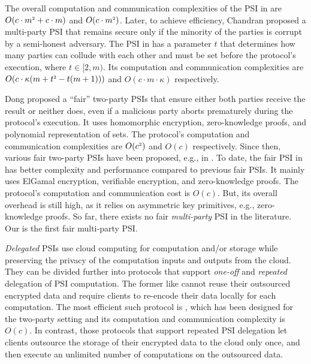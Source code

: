 The overall computation and communication complexities of the PSI in  \cite{DBLP:conf/ccs/KolesnikovMPRT17} are  $O(c\cdot m^{\scriptscriptstyle 2}+c\cdot m )$ and $O(c\cdot m^{\scriptscriptstyle 2})$. Later, to achieve efficiency, Chandran \et \cite{ChandranD0OSS21} proposed a multi-party PSI that remains secure only if the minority of the parties is corrupt by a semi-honest adversary. The PSI in \cite{NevoTY21} has a parameter $t$ that determines how many parties can collude with each other and must be set before the protocol's execution, where $t\in [2, m)$.  
%
%
Its computation and communication complexities are $O(c\cdot \kappa(m+t^{\scriptscriptstyle 2}-t(m+1)))$ and $O(c\cdot m\cdot \kappa)$ respectively.


Dong \et proposed a ``fair'' two-party PSIs \cite{DBLP:conf/dbsec/DongCCR13} that ensure either both parties receive the result or neither does, even if a malicious party aborts prematurely during the protocol's execution. It uses homomorphic encryption,  zero-knowledge proofs, and polynomial representation of sets. The protocol's  computation and communication complexities are $O(c^{\scriptscriptstyle 2})$ and $O(c)$  respectively. Since then, various fair two-party PSIs have been proposed, e.g.,  in \cite{DebnathD14,DebnathD16-,DebnathD16}. To date, the fair PSI in \cite{DebnathD16} has better complexity and performance compared to previous fair PSIs. It mainly uses  ElGamal encryption, verifiable encryption, and zero-knowledge proofs. The protocol's computation and communication cost is $O(c)$. But, its overall overhead is still high, as it relies on asymmetric key primitives, e.g.,  zero-knowledge proofs. So far, there exists no fair \emph{multi-party} PSI in the literature. Our \withFai is the first  fair multi-party PSI.%


 \textit{Delegated} PSIs use  cloud computing  for computation and/or storage while preserving the privacy of  the computation inputs and outputs from the cloud. They can be divided further into protocols that support \textit{one-off} and \textit{repeated} delegation of PSI computation. The former like \cite{kamarascaling,kerschbaum12,c18} cannot reuse their outsourced encrypted data and require clients to re-encode their data locally for each computation. The most efficient such protocol is \cite{kamarascaling}, which has been designed for the two-party setting and its computation and communication complexity is $O(c)$.  In contrast, those protocols that support repeated PSI delegation let clients outsource the storage of their encrypted data to the cloud only once, and then execute an unlimited number of computations on the outsourced data. 
 
